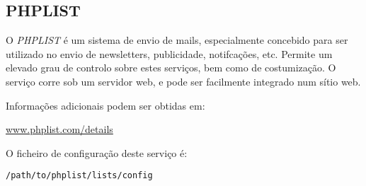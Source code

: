 \subsection{PHPLIST}

O \emph{PHPLIST} é um sistema de envio de mails, especialmente concebido para ser utilizado no
envio de newsletters, publicidade, notifcações, etc. Permite um elevado grau de controlo
sobre estes serviços, bem como de costumização.
O serviço corre sob um servidor web, e pode ser facilmente integrado num sítio web.

Informações adicionais podem ser obtidas em:

\begin{normalsize}\sffamily\href{http://www.phplist.com/details}{www.phplist.com/details}\end{normalsize}

O ficheiro de configuração deste serviço é:

\begin{Verbatim}[commandchars=\\\{\}]
/path/to/phplist/lists/config
\end{Verbatim}
